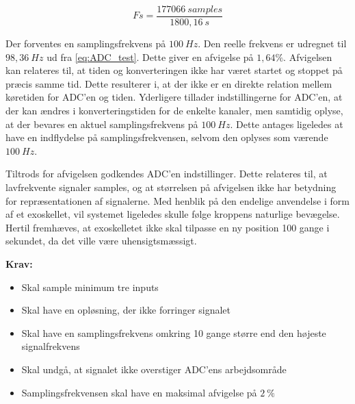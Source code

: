 \begin{equation}\label{eq:ADC_test}
Fs = \frac{177066~samples}{1800,16~s}
\end{equation}

\noindent
Der forventes en samplingsfrekvens på $100~Hz$. Den reelle frekvens er udregnet til $98,36~Hz$ ud fra \autoref{eq:ADC_test}. Dette giver en afvigelse på $1,64\%$. Afvigelsen kan relateres til, at tiden og konverteringen ikke har været startet og stoppet på præcis samme tid. Dette resulterer i, at der ikke er en direkte relation mellem køretiden for ADC'en og tiden. Yderligere tillader indstillingerne for ADC'en, at der kan ændres i konverteringstiden for de enkelte kanaler, men samtidig oplyse, at der bevares en aktuel samplingsfrekvens på $100~Hz$. Dette antages ligeledes at have en indflydelse på samplingsfrekvensen, selvom den oplyses som værende $100~Hz$. 

Tiltrods for afvigelsen godkendes ADC'en indstillinger. Dette relateres til, at lavfrekvente signaler samples, og at størrelsen på afvigelsen ikke har betydning for repræsentationen af signalerne. 
Med henblik på den endelige anvendelse i form af et exoskellet, vil systemet ligeledes skulle følge kroppens naturlige bevægelse. Hertil fremhæves, at exoskelletet ikke skal tilpasse en ny position 100 gange i sekundet, da det ville være uhensigtsmæssigt.


\vspace{3mm}
\textbf{Krav:}
\begin{itemize}
\item[\text{\sffamily \checkmark}] Skal sample minimum tre inputs 
\item[\text{\sffamily \checkmark}] Skal have en opløsning, der ikke forringer signalet
\item[\text{\sffamily \checkmark}] Skal have en samplingsfrekvens omkring 10 gange større end den højeste signalfrekvens
\item[\text{\sffamily \checkmark}] Skal undgå, at signalet ikke overstiger ADC'ens arbejdsområde
\item[\text{\sffamily \checkmark}] Samplingsfrekvensen skal have en maksimal afvigelse på $2~\%$
\end{itemize}

